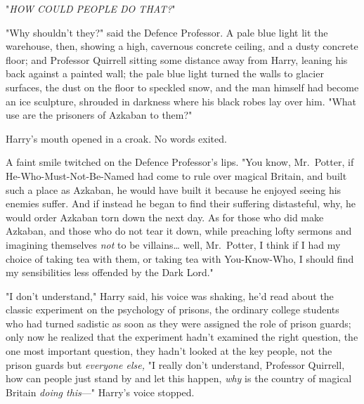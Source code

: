 "\emph{HOW COULD PEOPLE DO THAT?}"

"Why shouldn't they?" said the Defence Professor. A pale blue light lit the
warehouse, then, showing a high, cavernous concrete ceiling, and a dusty
concrete floor; and Professor Quirrell sitting some distance away from Harry,
leaning his back against a painted wall; the pale blue light turned the walls
to glacier surfaces, the dust on the floor to speckled snow, and the man
himself had become an ice sculpture, shrouded in darkness where his black robes
lay over him. "What use are the prisoners of Azkaban to them?"

Harry's mouth opened in a croak. No words exited.

A faint smile twitched on the Defence Professor's lips. "You know, Mr.~Potter,
if He-Who-Must-Not-Be-Named had come to rule over magical Britain, and built
such a place as Azkaban, he would have built it because he enjoyed seeing his
enemies suffer. And if instead he began to find their suffering distasteful,
why, he would order Azkaban torn down the next day. As for those who did make
Azkaban, and those who do not tear it down, while preaching lofty sermons and
imagining themselves \emph{not} to be villains{\ldots} well, Mr.~Potter, I
think if I had my choice of taking tea with them, or taking tea with
You-Know-Who, I should find my sensibilities less offended by the Dark Lord."

"I don't understand," Harry said, his voice was shaking, he'd read about the
classic experiment on the psychology of prisons, the ordinary college students
who had turned sadistic as soon as they were assigned the role of prison
guards; only now he realized that the experiment hadn't examined the right
question, the one most important question, they hadn't looked at the key
people, not the prison guards but \emph{everyone else,} "I really don't
understand, Professor Quirrell, how can people just stand by and let this
happen, \emph{why} is the country of magical Britain \emph{doing this}---"
Harry's voice stopped.

